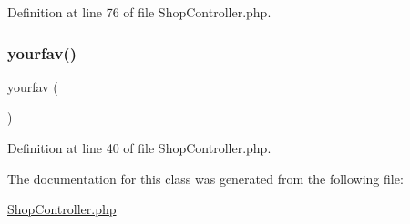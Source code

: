 Definition at line 76 of file Shop\+Controller.\+php.

\mbox{\label{class_responsive_1_1_http_1_1_controllers_1_1_shop_controller_a6fd757daf4769781192232c9615a4201}} 
\subsubsection{\texorpdfstring{yourfav()}{yourfav()}}
{\footnotesize\ttfamily yourfav (\begin{DoxyParamCaption}{ }\end{DoxyParamCaption})}



Definition at line 40 of file Shop\+Controller.\+php.



The documentation for this class was generated from the following file\+:\begin{DoxyCompactItemize}
\item 
\mbox{\hyperlink{_shop_controller_8php}{Shop\+Controller.\+php}}\end{DoxyCompactItemize}

